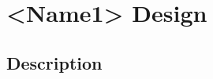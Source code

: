 \documentclass[]{article}
\begin{document}
\section{<Name1> Design}

\subsection{Description}

















\end{document}

